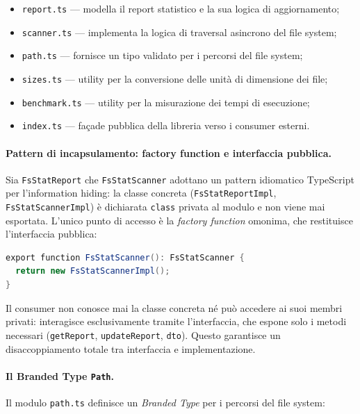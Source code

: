 \documentclass[11pt,a4paper]{article}
\begin{document}
\begin{itemize}
    \item \texttt{report.ts} — modella il report statistico e la sua logica di aggiornamento;
    \item \texttt{scanner.ts} — implementa la logica di traversal asincrono del file system;
    \item \texttt{path.ts} — fornisce un tipo validato per i percorsi del file system;
    \item \texttt{sizes.ts} — utility per la conversione delle unità di dimensione dei file;
    \item \texttt{benchmark.ts} — utility per la misurazione dei tempi di esecuzione;
    \item \texttt{index.ts} — façade pubblica della libreria verso i consumer esterni.
\end{itemize}

\paragraph{Pattern di incapsulamento: factory function e interfaccia pubblica.}

Sia \texttt{FsStatReport} che \texttt{FsStatScanner} adottano un pattern idiomatico TypeScript per l'information hiding: la classe concreta (\texttt{FsStatReportImpl}, \texttt{FsStatScannerImpl}) è dichiarata \texttt{class} privata al modulo e non viene mai esportata. L'unico punto di accesso è la \textit{factory function} omonima, che restituisce l'interfaccia pubblica:

\begin{lstlisting}[language=Java]
export function FsStatScanner(): FsStatScanner {
  return new FsStatScannerImpl();
}
\end{lstlisting}

Il consumer non conosce mai la classe concreta né può accedere ai suoi membri privati: interagisce esclusivamente tramite l'interfaccia, che espone solo i metodi necessari (\texttt{getReport}, \texttt{updateReport}, \texttt{dto}). Questo garantisce un disaccoppiamento totale tra interfaccia e implementazione.

\paragraph{Il Branded Type \texttt{Path}.}

Il modulo \texttt{path.ts} definisce un \textit{Branded Type} per i percorsi del file system:
\end{document}
